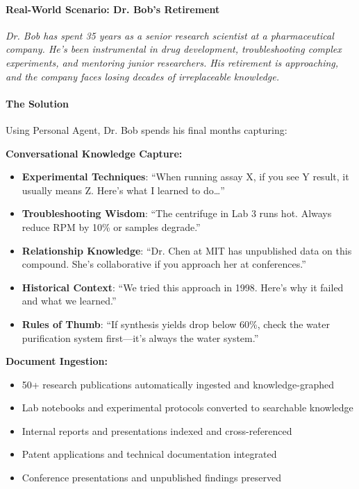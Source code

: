 \documentclass[11pt,letterpaper]{article}
\begin{document}
\paragraph{Real-World Scenario: Dr. Bob's Retirement}

\textit{Dr. Bob has spent 35 years as a senior research scientist at a pharmaceutical company. He's been instrumental in drug development, troubleshooting complex experiments, and mentoring junior researchers. His retirement is approaching, and the company faces losing decades of irreplaceable knowledge.}

\paragraph{The Solution}

Using Personal Agent, Dr. Bob spends his final months capturing:

\textbf{Conversational Knowledge Capture:}
\begin{itemize}[leftmargin=*]
    \item \textbf{Experimental Techniques}: ``When running assay X, if you see Y result, it usually means Z. Here's what I learned to do\ldots''
    \item \textbf{Troubleshooting Wisdom}: ``The centrifuge in Lab 3 runs hot. Always reduce RPM by 10\% or samples degrade.''
    \item \textbf{Relationship Knowledge}: ``Dr. Chen at MIT has unpublished data on this compound. She's collaborative if you approach her at conferences.''
    \item \textbf{Historical Context}: ``We tried this approach in 1998. Here's why it failed and what we learned.''
    \item \textbf{Rules of Thumb}: ``If synthesis yields drop below 60\%, check the water purification system first---it's always the water system.''
\end{itemize}

\textbf{Document Ingestion:}
\begin{itemize}[leftmargin=*]
    \item 50+ research publications automatically ingested and knowledge-graphed
    \item Lab notebooks and experimental protocols converted to searchable knowledge
    \item Internal reports and presentations indexed and cross-referenced
    \item Patent applications and technical documentation integrated
    \item Conference presentations and unpublished findings preserved
\end{itemize}
\end{document}
